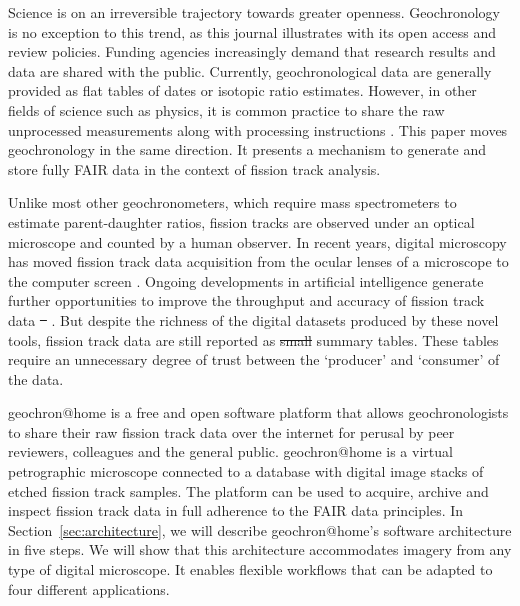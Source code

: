 \documentclass[gchron, manuscript]{copernicus}
\providecommand{\DIFaddtex}[1]{{\protect\color{blue}\uwave{#1}}} %
\providecommand{\DIFdeltex}[1]{{\protect\color{red}\sout{#1}}}                      %
\providecommand{\DIFaddbegin}{} %
\providecommand{\DIFaddend}{} %
\providecommand{\DIFdelbegin}{} %
\providecommand{\DIFdelend}{} %
\providecommand{\DIFadd}[1]{\texorpdfstring{\DIFaddtex{#1}}{#1}} %
\providecommand{\DIFdel}[1]{\texorpdfstring{\DIFdeltex{#1}}{}} %
\begin{document}
\introduction\label{sec:intro}

Science is on an irreversible trajectory towards greater
openness. Geochronology is no exception to this trend, as this journal
illustrates with its open access and review policies. Funding agencies
increasingly demand that research results and data are shared with the
public. Currently, geochronological data are generally provided as
flat tables of dates or isotopic ratio estimates. However, in other
fields of science such as physics, it is common practice to share the
raw unprocessed measurements along with processing instructions
\citep[e.g.,][]{abbott2016}. This paper moves geochronology in the
same direction. It presents a mechanism to generate and store fully
FAIR \citep[Findable, Accessible, Interoperable and
  Reproducible;][]{wilkinson2016} data in the context of fission track
analysis.\medskip

Unlike most other geochronometers, which require mass spectrometers to
estimate parent-daughter ratios, fission tracks are observed under an
optical microscope and counted by a human observer.  In recent years,
digital microscopy has moved fission track data acquisition from the
ocular lenses of a microscope to the computer screen
\citep{gleadow2009, vanranst2019, gleadow2019}. Ongoing developments
in artificial intelligence generate further opportunities to improve
the throughput and accuracy of fission track data
\DIFdelbegin \DIFdel{\mbox{%
\citep{nachtergaele2020}}\hskip0pt%
}\DIFdelend \DIFaddbegin \DIFadd{\mbox{%
\citep{nachtergaele2020,li2022,ren2023,boone2025}}\hskip0pt%
}\DIFaddend . But despite the
richness of the digital datasets produced by these novel tools,
fission track data are still reported as \DIFdelbegin \DIFdel{small }\DIFdelend \DIFaddbegin \DIFadd{numerical }\DIFaddend summary
tables. These tables require an unnecessary degree of trust between
the `producer' and `consumer' of the data.\medskip

geochron@home is a free and open software platform that allows
geochronologists to share their raw fission track data over the
internet for perusal by peer reviewers, colleagues and the general
public. geochron@home is a virtual petrographic microscope connected to a
database with digital image stacks of etched fission track
samples. The platform can be used to acquire, archive and inspect
fission track data in full adherence to the FAIR data principles. In
Section~\ref{sec:architecture}, we will describe geochron@home's software
architecture in five steps. We will show that this architecture
accommodates imagery from any type of digital microscope. It enables
flexible workflows that can be adapted to four different
applications.\medskip
\end{document}
